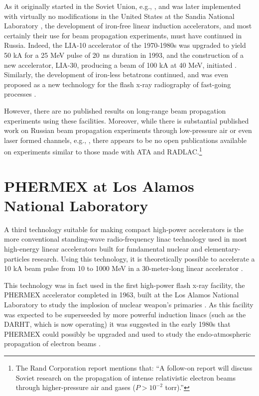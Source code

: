 \documentclass [12pt,a4paper,     ]{report} %
\begin{document}
As it originally started in the Soviet Union, e.g., \cite{PAVLO1974-, PAVLO1976-, PAVLO1980-}, and was later implemented with virtually no modifications in the United States at the Sandia National Laboratory \cite[p.70]{BYSTR1995B}, the development of iron-free linear induction accelerators, and most certainly their use for beam propagation experiments, must have continued in Russia.  Indeed, the LIA-10 accelerator of the 1970-1980s was upgraded to yield 50 kA for a 25 MeV pulse of 20~ns duration in 1993, and the construction of a new accelerator, LIA-30, producing a beam of 100 kA at 40 MeV, initiated \cite{BOSSA1993-}.  Similarly, the development of iron-less betatrons continued, and was even proposed as a new technology for the flash x-ray radiography of fast-going processes \cite{PAVLO1996-}.

However, there are no published results on long-range beam propagation experiments using these facilities. Moreover, while there is substantial published work on Russian beam propagation experiments through low-pressure air or even laser formed channels, e.g., \cite{KASSE1975-, WELLS1986-}, there appears to be no open publications available on experiments similar to those made with ATA and RADLAC.\footnote{The Rand Corporation report \cite{WELLS1986-} mentions that: ``A follow-on report will discuss Soviet research on the propagation of intense relativistic electron beams through higher-pressure air and gases ($P > 10^{-2}$ torr).''}


\section{PHERMEX at Los Alamos National Laboratory}
\label{phe:0}

A third technology suitable for making compact high-power accelerators is the more conventional standing-wave radio-frequency linac technology used in most high-energy linear accelerators built for fundamental nuclear and elementary-particles research.  Using this technology, it is theoretically possible to accelerate a 10 kA beam pulse from 10 to 1000 MeV in a 30-meter-long linear accelerator \cite{FAHEL1982-}.

This technology was in fact used in the first high-power flash x-ray facility, the PHERMEX accelerator completed in 1963, built at the Los Alamos National Laboratory to study the implosion of nuclear weapon's primaries  \cite{BOYD-1965-}.  As this facility was expected to be superseeded by more powerful induction linacs (such as the DARHT, which is now operating) it was suggested in the early 1980s that PHERMEX could possibly be upgraded and used to study the endo-atmospheric propagation of electron beams \cite{MOIR-1981-}. 
\end{document}
